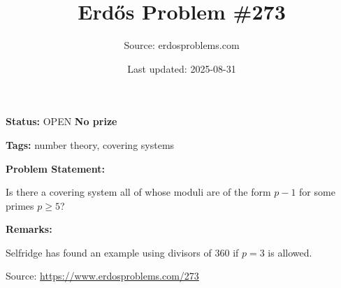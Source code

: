 \documentclass{article}
\title{Erd\H{o}s Problem \#273}
\date{Last updated: 2025-08-31}
\author{Source: erdosproblems.com}
\begin{document}
\maketitle

\noindent\textbf{Status:} OPEN \quad \textbf{No prize}

\noindent\textbf{Tags:} number theory, covering systems

\medskip
\noindent\textbf{Problem Statement:}

Is there a covering system all of whose moduli are of the form $p-1$ for some primes $p\geq 5$?

\bigskip
\noindent\textbf{Remarks:}

Selfridge has found an example using divisors of $360$ if $p=3$ is allowed.

\bigskip
\noindent\small{Source: \url{https://www.erdosproblems.com/273}}
\end{document}
